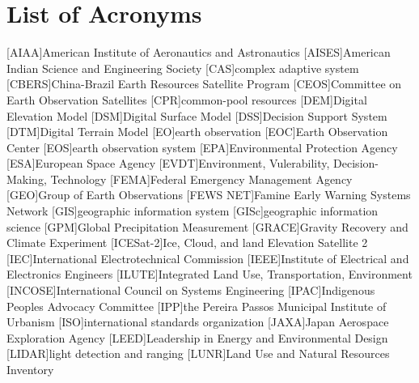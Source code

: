 \tableofcontents
\newpage
\listoffigures
\newpage
\listoftables
\newpage
\chapter*{List of Acronyms}

\begin{acronym}[HyperLEAVES] \itemsep0pt \setlength{\parskip}{0pt}
[AIAA]{American Institute of Aeronautics and Astronautics}
[AISES]{American Indian Science and Engineering Society}
[CAS]{complex adaptive system}
[CBERS]{China-Brazil Earth Resources Satellite Program}
[CEOS]{Committee on Earth Observation Satellites}
[CPR]{common-pool resources}
[DEM]{Digital Elevation Model}
[DSM]{Digital Surface Model}
[DSS]{Decision Support System}
[DTM]{Digital Terrain Model}
[EO]{earth observation}
[EOC]{Earth Observation Center}
[EOS]{earth observation system}
[EPA]{Environmental Protection Agency}
[ESA]{European Space Agency}
[EVDT]{Environment, Vulerability, Decision-Making, Technology}
[FEMA]{Federal Emergency Management Agency}
[GEO]{Group of Earth Observations}
[FEWS NET]{Famine Early Warning Systems Network}
[GIS]{geographic information system}
[GISc]{geographic information science}
[GPM]{Global Precipitation Measurement}
[GRACE]{Gravity Recovery and Climate Experiment}
[ICESat-2]{Ice, Cloud, and land Elevation Satellite 2}
[IEC]{International Electrotechnical Commission}
[IEEE]{Institute of Electrical and Electronics Engineers}
[ILUTE]{Integrated Land Use, Transportation, Environment}
[INCOSE]{International Council on Systems Engineering}
[IPAC]{Indigenous Peoples Advocacy Committee}
[IPP]{the Pereira Passos Municipal Institute of Urbanism}
[ISO]{international standards organization}
[JAXA]{Japan Aerospace Exploration Agency}
[LEED]{Leadership in Energy and Environmental Design}
[LIDAR]{light detection and ranging}
[LUNR]{Land Use and Natural Resources Inventory}

\end{acronym}
